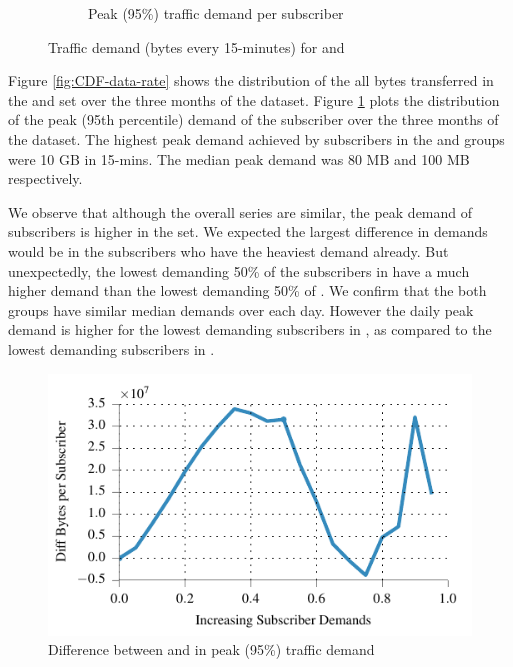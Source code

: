 \begin{figure}[t]
\begin{minipage}{1\linewidth}
\begin{subfigure}[b]{1\linewidth}
               \caption{Peak (95\%) traffic demand per subscriber\label{fig:CDF-data-rate-perc95}}
\end{subfigure}
%
\end{minipage}
\caption{Traffic demand (bytes every 15-minutes) for \control{} and \treatment{}\label{fig:traffic-demand-cdf}}
\end{figure}

Figure \ref{fig:CDF-data-rate} shows the distribution of the
all bytes transferred in the \treatment{} and \control{} set
over the three months of the dataset. Figure \ref{fig:CDF-data-rate-perc95}
plots the distribution of the peak (95th percentile) demand of the
subscriber over the three months of the dataset. The highest peak
demand achieved by subscribers in the \control{} and \treatment{}
groups were 10 GB in 15-mins. The median peak demand was 80 MB and
100 MB respectively.

We observe that although the overall series are similar, the peak demand of subscribers
is higher in the \treatment{} set. We expected the largest difference
in demands would be in the subscribers who have the heaviest demand already.
But unexpectedly, the lowest demanding 50\% of the subscribers in
\treatment{} have a much higher demand than the lowest demanding 50\% of \control{}.
We confirm that the both groups have similar median demands over each day. However
the daily peak demand is higher for the lowest demanding subscribers in
 \treatment{}, as compared to the lowest demanding subscribers in \control{}.

\begin{figure}[t]
\centering
\includegraphics[width=\linewidth]{figures/diff_perc95_bytes_subsc-overall.pdf}
               \caption{Difference between \treatment{} and \control{}
               in peak (95\%) traffic demand\label{fig:diff-perc95}}
\end{figure}

